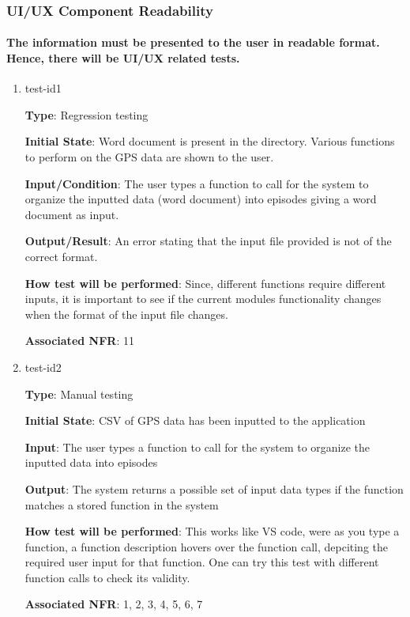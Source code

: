\documentclass[12pt, titlepage]{article}
\begin{document}
\subsubsection{UI/UX Component Readability }
\paragraph{The information must be presented to the user in readable format. Hence, there will be UI/UX related tests.}

\begin{enumerate}

\item{test-id1\\}

\textbf{Type}: Regression testing
					
\textbf{Initial State}: Word document is present in the directory. Various functions to perform on the GPS data are shown to the user.
					
\textbf{Input/Condition}: The user types a function to call for the system to organize the
inputted data (word document) into episodes giving a word document as input. 
					
\textbf{Output/Result}: An error stating that the input file provided is not of the correct format.
					
\textbf{How test will be performed}: Since, different functions require different inputs, it is important to see if the current modules functionality changes when the format of the input file changes.

\textbf{Associated NFR}: 11
\item{test-id2\\}

\textbf{Type}: Manual testing
					
\textbf{Initial State}: CSV of GPS data has been inputted to the application
					
\textbf{Input}: The user types a function to call for the system to organize the
inputted data into episodes
					
\textbf{Output}: The system returns a possible set of input data types if the function matches a stored function in the system
					
\textbf{How test will be performed}: This works like VS code, were as you type a function, a function description hovers over the function call, depciting the required user input for that function. One can try this test with different function calls to check its validity.

\textbf{Associated NFR}: 1, 2, 3, 4, 5, 6, 7 
\end{enumerate}
\end{document}
